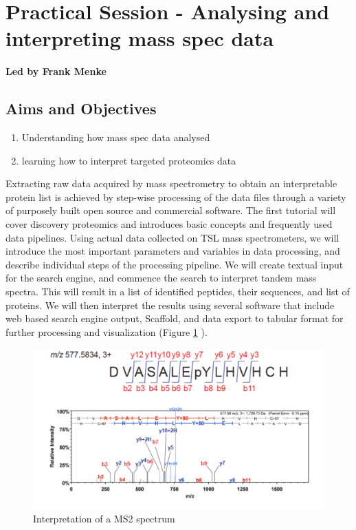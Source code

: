 \documentclass[12pt,]{book}
\providecommand{\tightlist}{%
  \setlength{\itemsep}{0pt}\setlength{\parskip}{0pt}}
\theoremstyle{definition}
\theoremstyle{definition}
\theoremstyle{remark}
\begin{document}
\section*{Practical Session - Analysing and interpreting mass spec
data}\label{practical-session---analysing-and-interpreting-mass-spec-data}

\textbf{Led by Frank Menke}

\subsection*{Aims and Objectives}\label{aims-and-objectives-6}

\begin{enumerate}
\def\labelenumi{\arabic{enumi}.}
\tightlist
\item
  Understanding how mass spec data analysed
\item
  learning how to interpret targeted proteomics data
\end{enumerate}

Extracting raw data acquired by mass spectrometry to obtain an
interpretable protein list is achieved by step-wise processing of the
data files through a variety of purposely built open source and
commercial software. The first tutorial will cover discovery proteomics
and introduces basic concepts and frequently used data pipelines. Using
actual data collected on TSL mass spectrometers, we will introduce the
most important parameters and variables in data processing, and describe
individual steps of the processing pipeline. We will create textual
input for the search engine, and commence the search to interpret tandem
mass spectra. This will result in a list of identified peptides, their
sequences, and list of proteins. We will then interpret the results
using several software that include web based search engine output,
Scaffold, and data export to tabular format for further processing and
visualization (Figure \ref{fig:pracp} ).

\begin{figure}
\includegraphics[width=6.06in]{assets/prot2} \caption{Interpretation of a MS2 spectrum}\label{fig:pracp}
\end{figure}
\end{document}
